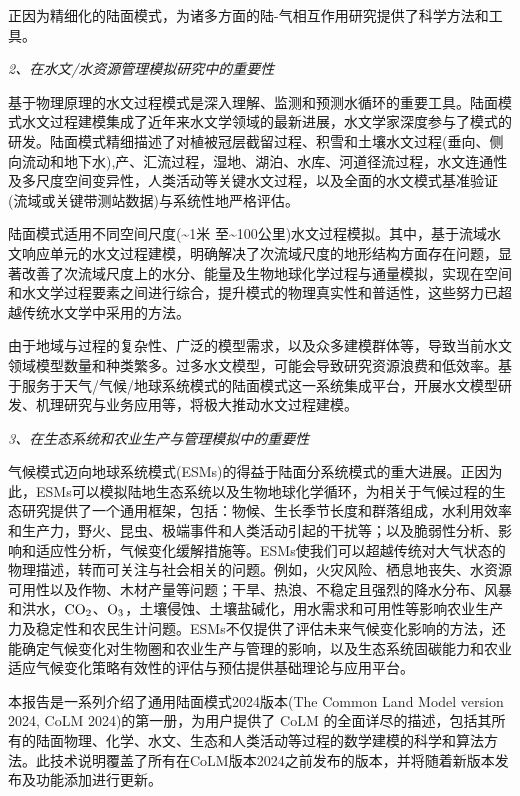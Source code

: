 正因为精细化的陆面模式，为诸多方面的陆-气相互作用研究提供了科学方法和工具。

\textit{2、在水文/水资源管理模拟研究中的重要性}

基于物理原理的水文过程模式是深入理解、监测和预测水循环的重要工具。陆面模式水文过程建模集成了近年来水文学领域的最新进展，水文学家深度参与了模式的研发。陆面模式精细描述了对植被冠层截留过程、积雪和土壤水文过程(垂向、侧向流动和地下水),产、汇流过程，湿地、湖泊、水库、河道径流过程，水文连通性及多尺度空间变异性，人类活动等关键水文过程，以及全面的水文模式基准验证(流域或关键带测站数据)与系统性地严格评估。

陆面模式适用不同空间尺度(\textasciitilde1米 至\textasciitilde100公里)水文过程模拟。其中，基于流域水文响应单元的水文过程建模，明确解决了次流域尺度的地形结构方面存在问题，显著改善了次流域尺度上的水分、能量及生物地球化学过程与通量模拟，实现在空间和水文学过程要素之间进行综合，提升模式的物理真实性和普适性，这些努力已超越传统水文学中采用的方法。

由于地域与过程的复杂性、广泛的模型需求，以及众多建模群体等，导致当前水文领域模型数量和种类繁多。过多水文模型，可能会导致研究资源浪费和低效率。基于服务于天气/气候/地球系统模式的陆面模式这一系统集成平台，开展水文模型研发、机理研究与业务应用等，将极大推动水文过程建模。

\textit{3、在生态系统和农业生产与管理模拟中的重要性}

气候模式迈向地球系统模式(ESMs)的得益于陆面分系统模式的重大进展。正因为此，ESMs可以模拟陆地生态系统以及生物地球化学循环，为相关于气候过程的生态研究提供了一个通用框架，包括：物候、生长季节长度和群落组成，水利用效率和生产力，野火、昆虫、极端事件和人类活动引起的干扰等；以及脆弱性分析、影响和适应性分析，气候变化缓解措施等。ESMs使我们可以超越传统对大气状态的物理描述，转而可关注与社会相关的问题。例如，火灾风险、栖息地丧失、水资源可用性以及作物、木材产量等问题；干旱、热浪、不稳定且强烈的降水分布、风暴和洪水，$\rm CO_2$、$\rm O_3$，土壤侵蚀、土壤盐碱化，用水需求和可用性等影响农业生产力及稳定性和农民生计问题。ESMs不仅提供了评估未来气候变化影响的方法，还能确定气候变化对生物圈和农业生产与管理的影响，以及生态系统固碳能力和农业适应气候变化策略有效性的评估与预估提供基础理论与应用平台。

本报告是一系列介绍了通用陆面模式2024版本(The Common Land Model version 2024, CoLM 2024)的第一册，为用户提供了 CoLM 的全面详尽的描述，包括其所有的陆面物理、化学、水文、生态和人类活动等过程的数学建模的科学和算法方法。此技术说明覆盖了所有在CoLM版本2024之前发布的版本，并将随着新版本发布及功能添加进行更新。

